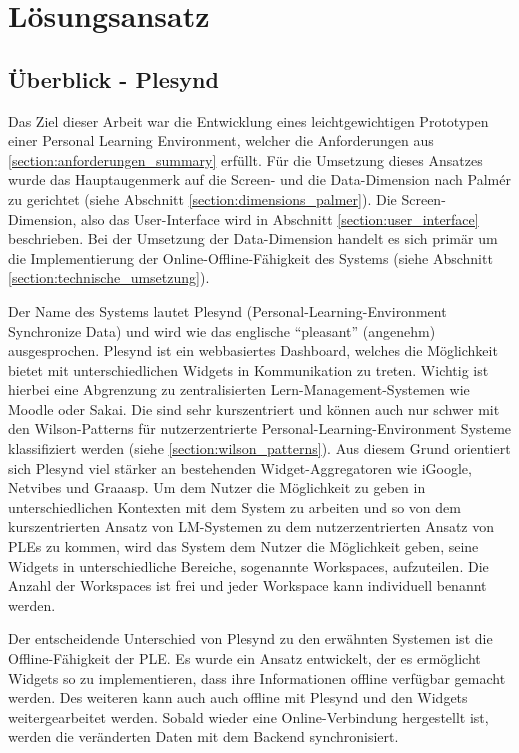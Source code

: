 \chapter{Lösungsansatz} 
\label{Kapitel 5}

\section{Überblick - Plesynd}
Das Ziel dieser Arbeit war die Entwicklung eines leichtgewichtigen Prototypen einer Personal Learning Environment, welcher die Anforderungen aus \ref{section:anforderungen_summary} erfüllt. Für die Umsetzung dieses Ansatzes wurde das Hauptaugenmerk auf die Screen- und die Data-Dimension nach Palmér zu gerichtet (siehe Abschnitt \ref{section:dimensions_palmer}). Die Screen-Dimension, also das User-Interface wird in Abschnitt \ref{section:user_interface} beschrieben. Bei der Umsetzung der Data-Dimension handelt es sich primär um die Implementierung der Online-Offline-Fähigkeit des Systems (siehe Abschnitt \ref{section:technische_umsetzung}).

Der Name des Systems lautet Plesynd (Personal-Learning-Environment Synchronize Data) und wird wie das englische "`pleasant"' (angenehm) ausgesprochen. Plesynd ist ein webbasiertes Dashboard, welches die Möglichkeit bietet mit unterschiedlichen Widgets in Kommunikation zu treten. Wichtig ist hierbei eine Abgrenzung zu zentralisierten Lern-Management-Systemen wie Moodle oder Sakai. Die sind sehr kurszentriert und können auch nur schwer mit den Wilson-Patterns für nutzerzentrierte Personal-Learning-Environment Systeme klassifiziert werden (siehe \ref{section:wilson_patterns}). Aus diesem Grund orientiert sich Plesynd viel stärker an bestehenden Widget-Aggregatoren wie iGoogle, Netvibes und Graaasp. Um dem Nutzer die Möglichkeit zu geben in unterschiedlichen Kontexten mit dem System zu arbeiten und so von dem kurszentrierten Ansatz von LM-Systemen zu dem nutzerzentrierten Ansatz von PLEs zu kommen, wird das System dem Nutzer die Möglichkeit geben, seine Widgets in unterschiedliche Bereiche, sogenannte Workspaces, aufzuteilen. Die Anzahl der Workspaces ist frei und jeder Workspace kann individuell benannt werden.

Der entscheidende Unterschied von Plesynd zu den erwähnten Systemen ist die Offline-Fähigkeit der PLE. Es wurde ein Ansatz entwickelt, der es ermöglicht Widgets so zu implementieren, dass ihre Informationen offline verfügbar gemacht werden. Des weiteren kann auch auch offline mit Plesynd und den Widgets weitergearbeitet werden. Sobald wieder eine Online-Verbindung hergestellt ist, werden die veränderten Daten mit dem Backend synchronisiert.

